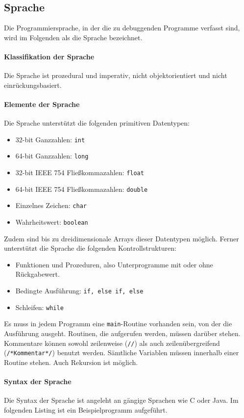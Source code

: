 \documentclass[parskip=full]{scrartcl}
\begin{document}
\subsection{Sprache}
Die Programmiersprache, in der die zu debuggenden Programme verfasst sind, wird im Folgenden als die Sprache bezeichnet. 
\paragraph{Klassifikation der Sprache} Die Sprache ist prozedural und imperativ, nicht objektorientiert und nicht einrückungsbasiert.
\paragraph{Elemente der Sprache}
Die Sprache unterstützt die folgenden primitiven Datentypen:
\begin{itemize}
\item  32-bit Ganzzahlen: \texttt{int}
  \item  64-bit Ganzzahlen: \texttt{long}
 \item  32-bit IEEE 754 Fließkommazahlen: \texttt{float}
 \item   64-bit IEEE 754 Fließkommazahlen: \texttt{double}
  \item  Einzelnes Zeichen: \texttt{char}
  \item  Wahrheitswert: \texttt{boolean}
\end{itemize}
Zudem sind bis zu dreidimensionale Arrays dieser Datentypen möglich.
Ferner unterstützt die Sprache die folgenden Kontrollstrukturen:
\begin{itemize}
\item Funktionen und Prozeduren, also Unterprogramme mit oder ohne Rückgabewert.
\item Bedingte Ausführung: \texttt{if, else if, else}
\item Schleifen: \texttt{while}
\end{itemize}
Es muss in jedem Programm eine \texttt{main}-Routine vorhanden sein, von der die Ausführung ausgeht. Routinen, die aufgerufen werden, müssen darüber stehen. Kommentare können sowohl zeilenweise (\texttt{//}) als auch zeilenübergreifend (\texttt{/*Kommentar*/}) benutzt werden. Sämtliche Variablen müssen innerhalb einer Routine stehen. Auch Rekursion ist möglich.
\newpage

\paragraph{Syntax der Sprache}
Die Syntax der Sprache ist angeleht an gängige Sprachen wie C oder Java. Im folgenden Listing ist ein Beispielprogramm aufgeführt. 
\end{document}
